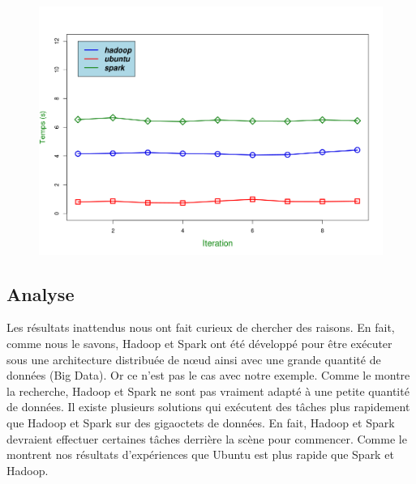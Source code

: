\documentclass[11pt]{article}
\begin{document}
\begin{figure}
    \centering
    \includegraphics[width=1\textwidth]{images/ada.png}
    \label{fig:CF1}
\end{figure}
\subsection{Analyse}

Les résultats inattendus nous ont fait curieux de chercher des raisons. En fait, comme nous le savons, Hadoop et Spark ont été développé pour être exécuter sous une architecture distribuée de nœud ainsi avec une grande quantité de données (Big Data). Or ce n'est pas le cas avec notre exemple. Comme le montre la recherche, Hadoop et Spark ne sont pas vraiment adapté à une petite quantité de données. Il existe plusieurs solutions qui exécutent des tâches plus rapidement que Hadoop et Spark sur des gigaoctets de données. En fait, Hadoop et Spark devraient effectuer certaines tâches derrière la scène pour commencer. Comme le montrent nos résultats d'expériences que Ubuntu est plus rapide que Spark et Hadoop.

\pagebreak
\end{document}
